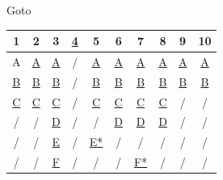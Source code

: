 \documentclass[a4paper, 11pt, UTF8]{article}
\begin{document}
\begin{large}
\begin{center}

Goto\vspace{8pt}\par

\begin{tabular}{ c c c c c c c c c c }
\hline
                 1  &                  2  &                  3  &  \hyperlink{Ch4}{4} &                  5  &                  6  &              7      &                  8  &                  9  &                  10\\\hline
                {A} & \hyperlink{Ch2A}{A} & \hyperlink{Ch3A}{A} &                 {/} & \hyperlink{Ch5A}{A} & \hyperlink{Ch6A}{A} & \hyperlink{Ch7A}{A} & \hyperlink{Ch8A}{A} & \hyperlink{Ch9A}{A} & \hyperlink{Ch10A}{A}\\
\hyperlink{Ch1B}{B} & \hyperlink{Ch2B}{B} & \hyperlink{Ch3B}{B} &                 {/} & \hyperlink{Ch5B}{B} & \hyperlink{Ch6B}{B} & \hyperlink{Ch7B}{B} & \hyperlink{Ch8B}{B} & \hyperlink{Ch9B}{B} & \hyperlink{Ch10B}{B}\\
\hyperlink{Ch1C}{C} & \hyperlink{Ch2C}{C} & \hyperlink{Ch3C}{C} &                 {/} & \hyperlink{Ch5C}{C} & \hyperlink{Ch6C}{C} & \hyperlink{Ch7C}{C} & \hyperlink{Ch8C}{C} &                 {/} &                  {/}\\
                {/} &                 {/} & \hyperlink{Ch3D}{D} &                 {/} &                 {/} & \hyperlink{Ch6D}{D} & \hyperlink{Ch7D}{D} & \hyperlink{Ch8D}{D} &                 {/} &                  {/}\\
                {/} &                 {/} & \hyperlink{Ch3E}{E} &                 {/} & \hyperlink{Ch5E}{E*}&                 {/} &                 {/} &                 {/} &                 {/} &                  {/}\\
                {/} &                 {/} & \hyperlink{Ch3F}{F} &                 {/} &                 {/} &                 {/} & \hyperlink{Ch7F}{F*}&                 {/} &                 {/} &                  {/}\\
\hline
\end{tabular}


\end{center}
\end{large}
\end{document}
